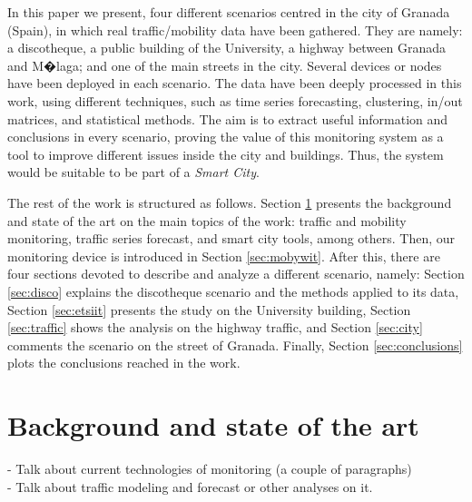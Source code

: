 \documentclass[preprint]{elsarticle}
\begin{document}
In this paper we present, four different scenarios centred in the city of Granada (Spain), in which real traffic/mobility data have been gathered. They are namely: a discotheque, a public building of the University, a highway between Granada and M�laga; and one of the main streets in the city.
Several devices or nodes have been deployed in each scenario.
The data have been deeply processed in this work, using different techniques, such as time series forecasting, clustering, in/out matrices, and statistical methods.
The aim is to extract useful information and conclusions in every scenario, proving the value of this monitoring system as a tool to improve different issues inside the city and buildings. Thus, the system would be suitable to be part of a \textit{Smart City}.

The rest of the work is structured as follows. Section \ref{sec:soa} presents the background and state of the art on the main topics of the work: traffic and mobility monitoring, traffic series forecast, and smart city tools, among others.
Then, our monitoring device is introduced in Section \ref{sec:mobywit}.
After this, there are four sections devoted to describe and analyze a different scenario, namely: Section \ref{sec:disco} explains the discotheque scenario and the methods applied to its data, Section \ref{sec:etsiit} presents the study on the University building, Section \ref{sec:traffic} shows the analysis on the highway traffic, and Section \ref{sec:city} comments the scenario on the street of Granada.
Finally, Section \ref{sec:conclusions} plots the conclusions reached in the work.




\section{Background and state of the art}
\label{sec:soa}

- Talk about current technologies of monitoring (a couple of paragraphs)\\

- Talk about traffic modeling and forecast or other analyses on it.\\
\end{document}
